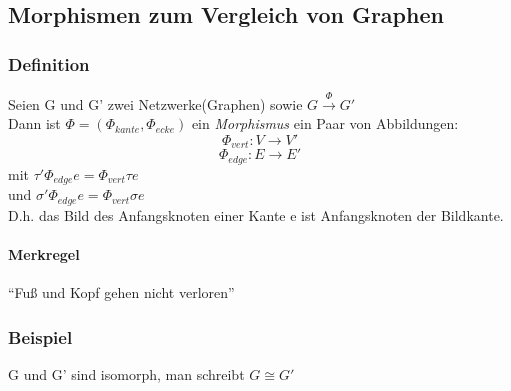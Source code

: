 \subsection{Morphismen zum Vergleich von Graphen}
\subsubsection{Definition}
Seien G und G' zwei Netzwerke(Graphen) sowie $G \overset{\Phi}{\rightarrow} G'$ 
\\Dann ist $\Phi  = (\Phi_{kante}, \Phi_{ecke})$  ein \emph{Morphismus} ein Paar von Abbildungen:
$$ \Phi_{vert}: V \rightarrow V'$$
$$\Phi_{edge}: E \rightarrow E'$$
mit $\tau' \Phi_{edge} e = \Phi_{vert} \tau e$
\\und $ {\sigma '}  \Phi_{edge} e = \Phi_{vert} \sigma e$
\\D.h. das Bild des Anfangsknoten einer Kante e ist Anfangsknoten der Bildkante.
\paragraph{Merkregel}``Fuß und Kopf gehen nicht verloren''

\subsubsection{Beispiel}
\begin{figure}[h!]
  \hfill
\end{figure}
G und G' sind isomorph, man schreibt $G \cong G'$
